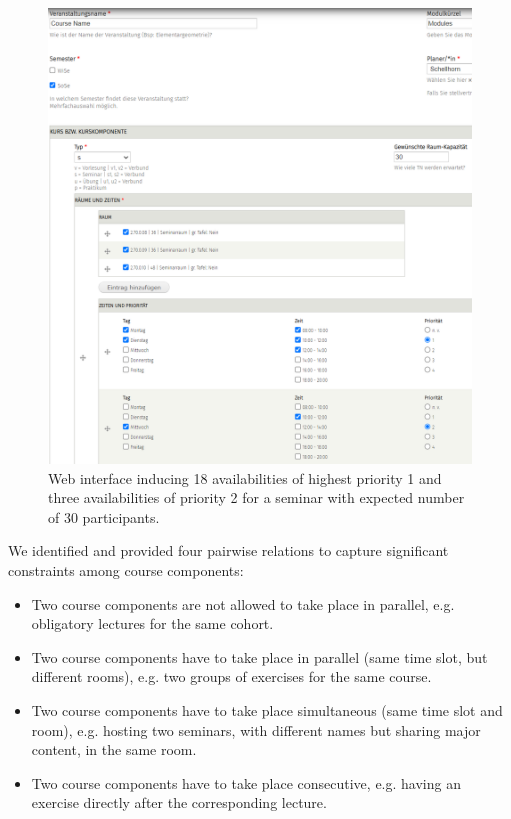 \documentclass{easychair}
\begin{document}
  \begin{figure}
    \includegraphics[width=\linewidth]{webinterface}
    \caption{Web interface inducing 18 availabilities of highest priority 1 and three availabilities of priority 2 for a seminar with expected number of 30 participants.}
    \label{fig:web interface}
  \end{figure}
  We identified and provided four pairwise relations to capture significant constraints among course components: \newpage
  \begin{itemize}
    \item Two course components are not allowed to take place in parallel, e.g. obligatory lectures for the same cohort.
    \item Two course components have to take place in parallel (same time slot, but different rooms), e.g. two groups of exercises for the same course.
    \item Two course components have to take place simultaneous (same time slot and room), e.g. hosting two seminars, with different names but sharing major content, in the same room.
    \item Two course components have to take place consecutive, e.g. having an exercise directly after the corresponding lecture. 
  \end{itemize}
\end{document}
